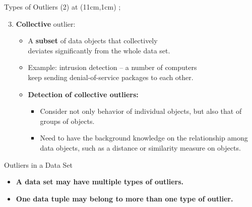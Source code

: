 \begin{frame}{Types of Outliers (2)}
	\tikzoverlay at (11cm,1cm) {};
	\begin{enumerate}
		\setcounter{enumi}{2}
		\item \textbf{Collective} outlier:
		      \begin{itemize}
			      \item A \textbf{subset} of data objects that collectively \\
			            deviates significantly from the whole data set.
			      \item Example: intrusion detection -- a number of computers \\
			            keep sending denial-of-service packages to each other.
			      \item \textbf{Detection of collective outliers:}
			            \begin{itemize}
				            \item Consider not only behavior of individual objects, but also that of groups of objects.
				            \item Need to have the background knowledge on the relationship among data objects, such as a distance or similarity measure on objects.
			            \end{itemize}
		      \end{itemize}
	\end{enumerate}

	\begin{alertblock}{Outliers in a Data Set}
		\begin{itemize}
			\item \textbf{A data set may have multiple types of outliers.}
			\item \textbf{One data tuple may belong to more than one type of outlier.}
		\end{itemize}

	\end{alertblock}
\end{frame}


